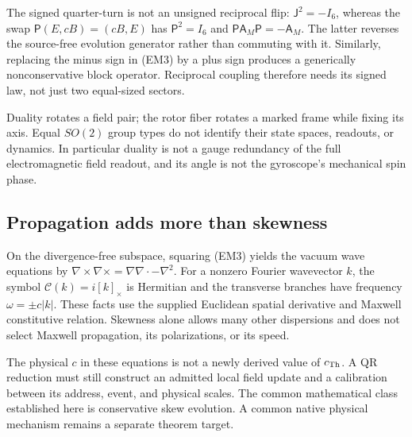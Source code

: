 The signed quarter-turn is not an unsigned reciprocal flip: $\mathsf J^2=-I_6$, whereas the swap $\mathsf P(E,cB)=(cB,E)$ has $\mathsf P^2=I_6$ and $\mathsf P\mathsf A_M\mathsf P=-\mathsf A_M$. The latter reverses the source-free evolution generator rather than commuting with it. Similarly, replacing the minus sign in (EM3) by a plus sign produces a generically nonconservative block operator. Reciprocal coupling therefore needs its signed law, not just two equal-sized sectors.

Duality rotates a field pair; the rotor fiber rotates a marked frame while fixing its axis. Equal $SO(2)$ group types do not identify their state spaces, readouts, or dynamics. In particular duality is not a gauge redundancy of the full electromagnetic field readout, and its angle is not the gyroscope's mechanical spin phase.

\subsection{Propagation adds more than skewness}
On the divergence-free subspace, squaring (EM3) yields the vacuum wave equations by $\nabla\times\nabla\times=\nabla\nabla\cdot-\nabla^2$. For a nonzero Fourier wavevector $k$, the symbol $\mathscr C(k)=i[k]_\times$ is Hermitian and the transverse branches have frequency $\omega=\pm c|k|$. These facts use the supplied Euclidean spatial derivative and Maxwell constitutive relation. Skewness alone allows many other dispersions and does not select Maxwell propagation, its polarizations, or its speed.

The physical $c$ in these equations is not a newly derived value of $c_{\rm Th}$. A QR reduction must still construct an admitted local field update and a calibration between its address, event, and physical scales. The common mathematical class established here is conservative skew evolution. A common native physical mechanism remains a separate theorem target.
\endgroup
\setcounter{section}{37}

